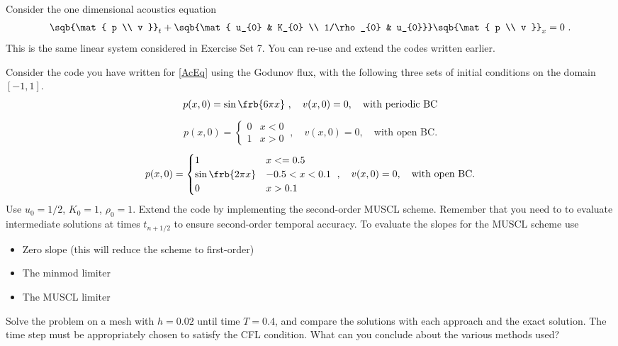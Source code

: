 \documentclass{article}
\begin{document}



Consider the one dimensional acoustics equation
\begin{gather} \label{AcEq}
	\sqb{\mat{ p \\ v }}_{t} +\sqb{\mat{ u_{0} & K_{0} \\ 1/\rho_{0} & u_{0}}} \sqb{\mat{ p \\ v }}_{x}=0\ .
\end{gather}%
This is the same linear system considered in Exercise Set 7. You can re-use and extend the codes written earlier.




\begin{exerciseList}


\item
Consider the code you have written for \eqref{AcEq} using the Godunov flux, with the following three sets of initial conditions on the domain $[-1,1]$.
\begin{gather} \label{inData1}
	p(x,0)=\sin\frb{6\pi x}\ ,
	\quad
	v(x,0)=0, \quad \text{with periodic BC}
\end{gather}%
\begin{gather} \label{inData2}
	p(x,0)=\begin{cases}
		0 & x<0\\
		1 & x>0
	\end{cases}\ ,
	\quad
	v(x,0)=0, \quad \text{with open BC}.
\end{gather}%
\begin{gather} \label{inData3}
	p(x,0)=\begin{cases}
		1 & x<=0.5\\
		\sin\frb{2\pi x} & -0.5<x<0.1\\
		0 & x > 0.1
	\end{cases}\ ,
	\quad
	v(x,0)=0, \quad \text{with open BC}.
\end{gather}%
Use $u_{0}=1/2$, $K_{0}=1$, $\rho_{0}=1$. Extend the code by implementing the second-order MUSCL scheme. Remember that you need to to evaluate intermediate solutions at times $t_{n+1/2}$ to ensure second-order temporal accuracy. To evaluate the slopes for the MUSCL scheme use
\begin{itemize}
\item Zero slope (this will reduce the scheme to first-order)
\item The minmod limiter
\item The MUSCL limiter
\end{itemize} 

\item Solve the problem on a mesh with $h=0.02$ until time $T=0.4$, and compare the solutions with each approach and the exact solution. The time step must be appropriately chosen to satisfy the CFL condition. What can you conclude about the various methods used?



\end{exerciseList}
\end{document}

